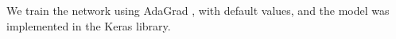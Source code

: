 We train the network using AdaGrad \cite{Duchi2011}, with default values, and the model was implemented in the Keras library. %




